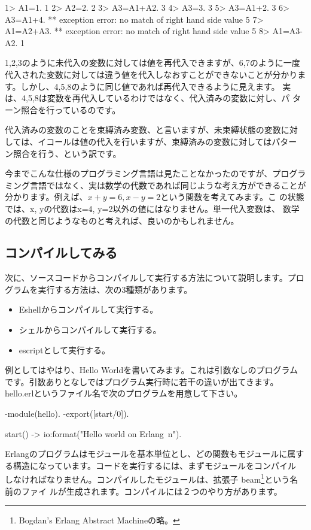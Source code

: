 \documentclass[mingoth,a4paper]{jsarticle}
\begin{document}
\begin{commandline}
1> A1=1.
1
2> A2=2.
2
3> A3=A1+A2.
3
4> A3=3.
3
5> A3=A1+2. 
3
6> A3=A1+4.
** exception error: no match of right hand side value 5
7> A1=A2+A3. 
** exception error: no match of right hand side value 5
8> A1=A3-A2.
1
\end{commandline}

1,2,3のように未代入の変数に対しては値を再代入できますが、6,7のように一度
代入された変数に対しては違う値を代入しなおすことができないことが分かりま
す。しかし、4,5,8のように同じ値であれば再代入できるように見えます。
実は、4,5,8は変数を再代入しているわけではなく、代入済みの変数に対し、パ
ターン照合を行っているのです。

代入済みの変数のことを束縛済み変数、と言いますが、未束縛状態の変数に対
しては、イコールは値の代入を行いますが、束縛済みの変数に対してはパター
ン照合を行う、という訳です。

今までこんな仕様のプログラミング言語は見たことなかったのですが、プログラ
ミング言語ではなく、実は数学の代数であれば同じような考え方ができることが
分かります。例えば、$ x + y = 6, x - y = 2$という関数を考えてみます。こ
の状態では、x, yの代数はx=4, y=2以外の値にはなりません。単一代入変数は、
数学の代数と同じようなものと考えれば、良いのかもしれません。

\subsection{コンパイルしてみる}
次に、ソースコードからコンパイルして実行する方法について説明します。プロ
グラムを実行する方法は、次の3種類があります。
\begin{itemize}
 \item Eshellからコンパイルして実行する。
 \item シェルからコンパイルして実行する。
 \item escriptとして実行する。
\end{itemize}

例としてはやはり、Hello Worldを書いてみます。これは引数なしのプログラム
です。引数ありとなしではプログラム実行時に若干の違いが出てきます。
hello.erlというファイル名で次のプログラムを用意して下さい。

\begin{commandline}
-module(hello).
-export([start/0]).

start() ->
    io:format("Hello world on Erlang~n").
\end{commandline}

Erlangのプログラムはモジュールを基本単位とし、どの関数もモジュールに属す
 る構造になっています。コードを実行するには、まずモジュールをコンパイル
 しなければなりません。コンパイルしたモジュールは、拡張子
 beam\footnote{Bogdan's Erlang Abstract Machineの略。}という名前のファイ
 ルが生成されます。コンパイルには２つのやり方があります。
\end{document}

